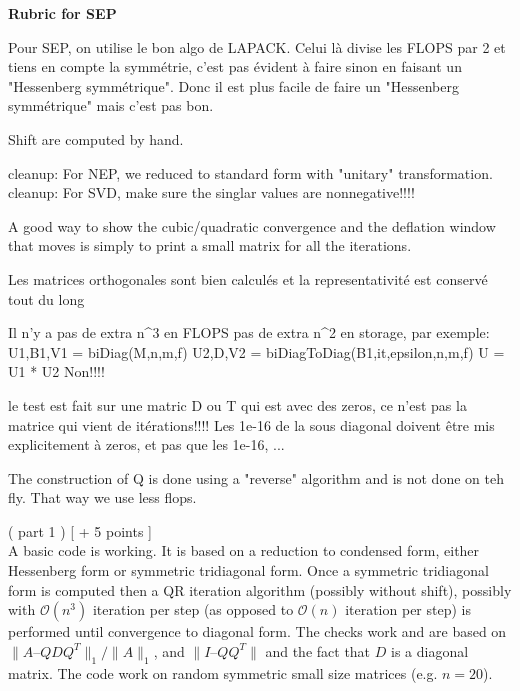 \documentclass[11pt,letterpaper]{article}
\begin{document}

\small

{\bf Rubric for SEP}

Pour SEP, on utilise le bon algo de LAPACK. Celui là divise les FLOPS par 2 et tiens en compte la symmétrie, 
c'est pas évident à faire sinon en faisant un "Hessenberg symmétrique". Donc il est plus facile de faire 
un "Hessenberg symmétrique" mais c'est pas bon.

Shift are computed by hand.

cleanup: For NEP, we reduced to standard form with "unitary" transformation.
cleanup: For SVD, make sure the singlar values are nonnegative!!!!

A good way to show the cubic/quadratic convergence and the deflation window that moves is simply to 
print a small matrix for all the iterations.

Les matrices orthogonales sont bien calculés et la representativité est conservé tout du long

Il n'y a pas de extra n^3 en FLOPS pas de extra n^2 en storage, par exemple:
        U1,B1,V1 = biDiag(M,n,m,f)
        U2,D,V2 = biDiagToDiag(B1,it,epsilon,n,m,f)
        U = U1 * U2
Non!!!!



le test est fait sur une matric D ou T qui est avec des zeros, ce n'est pas la matrice qui vient de itérations!!!!
Les 1e-16 de la sous diagonal doivent être mis explicitement à zeros, et pas que les 1e-16, ...

The construction of Q is done using a "reverse" algorithm and is not done on teh fly. That way we use less flops.



( part 1 ) [ + 5 points ] \\
A basic code is working. It is based on a reduction to condensed form, either
Hessenberg form or symmetric tridiagonal form. Once a symmetric tridiagonal
form is computed then a QR iteration algorithm (possibly without shift),
possibly with $\mathcal{O}(n^3)$ iteration per step (as opposed to
$\mathcal{O}(n)$ iteration per step) is performed until convergence to diagonal
form. The checks work and are based on $\| A – Q D Q^T \|_1 / \| A \|_1$, and 
$\| I – QQ^T \|$ and the fact that $D$ is a diagonal matrix. The code work on random
symmetric small size matrices (e.g. $n = 20$).
\end{document}
